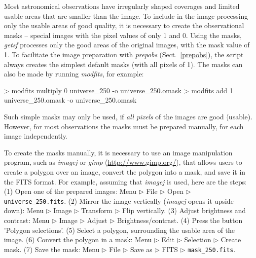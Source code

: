 \documentclass[a4paper,10pt]{article}
\begin{document}
Most astronomical observations have irregularly shaped coverages and limited usable areas that are smaller than the image. To
include in the image processing only the usable areas of good quality, it is necessary to create the observational masks -- special
images with the pixel values of only 1 and 0. Using the masks, \textsl{getsf} processes only the good areas of the original images,
with the mask value of 1. To facilitate the image preparation with \textsl{prepobs} (Sect.~\ref{prepobs}), the script always
creates the simplest default masks (with all pixels of 1). The masks can also be made by running \textsl{modfits}, for example:
\begin{verbnobox}[\mbox{}\small]
> modfits multiply 0 universe_250 -o universe_250.omask
> modfits add 1 universe_250.omask -o universe_250.omask
\end{verbnobox}
Such simple masks may only be used, if \emph{all pixels} of the images are good (usable). However, for most observations the masks
must be prepared manually, for each image independently.

To create the masks manually, it is necessary to use an image manipulation program, such as \textsl{imagej}
\citep{Abramoff_etal2004} or \textsl{gimp} (\url{http://www.gimp.org/}), that allows users to create a polygon over an image,
convert the polygon into a mask, and save it in the FITS format. For example, assuming that \textsl{imagej} is used, here are the
steps: (1) Open one of the prepared images: Menu $\rhd$ File $\rhd$ Open $\rhd$ \verb!universe_250.fits!. (2) Mirror the image
vertically (\textsl{imagej} opens it upside down): Menu $\rhd$ Image $\rhd$ Transform $\rhd$ Flip vertically. (3) Adjust brightness
and contrast: Menu $\rhd$ Image $\rhd$ Adjust $\rhd$ Brightness/contrast. (4) Press the button 'Polygon selections'. (5) Select a
polygon, surrounding the usable area of the image. (6) Convert the polygon in a mask: Menu $\rhd$ Edit $\rhd$ Selection $\rhd$
Create mask. (7) Save the mask: Menu $\rhd$ File $\rhd$ Save as $\rhd$ FITS $\rhd$ \verb!mask_250.fits!.
\end{document}
